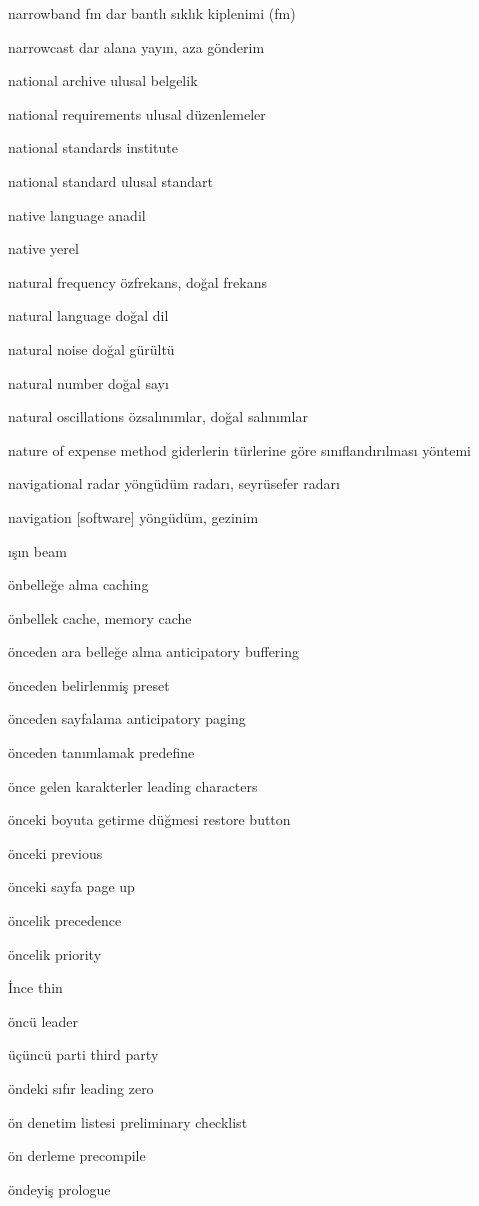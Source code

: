 \documentclass[12pt,fleqn]{article}\usepackage{../../common}
\begin{document}
narrowband fm dar bantlı sıklık kiplenimi (fm)

narrowcast dar alana yayın, aza gönderim

national archive ulusal belgelik

national requirements ulusal düzenlemeler

national standards institute

national standard ulusal standart

native language anadil

native yerel

natural frequency özfrekans, doğal frekans

natural language doğal dil

natural noise doğal gürültü

natural number doğal sayı

natural oscillations özsalınımlar, doğal salınımlar

nature of expense method giderlerin türlerine göre sınıflandırılması yöntemi

navigational radar yöngüdüm radarı, seyrüsefer radarı

navigation [software] yöngüdüm, gezinim

ışın beam

önbelleğe alma caching

önbellek cache, memory cache

önceden ara belleğe alma anticipatory buffering

önceden belirlenmiş preset

önceden sayfalama anticipatory paging

önceden tanımlamak predefine

önce gelen karakterler leading characters

önceki boyuta getirme düğmesi restore button

önceki previous

önceki sayfa page up

öncelik precedence

öncelik priority

İnce thin

öncü leader

üçüncü parti third party

öndeki sıfır leading zero

ön denetim listesi preliminary checklist

ön derleme precompile

öndeyiş prologue
\end{document}
